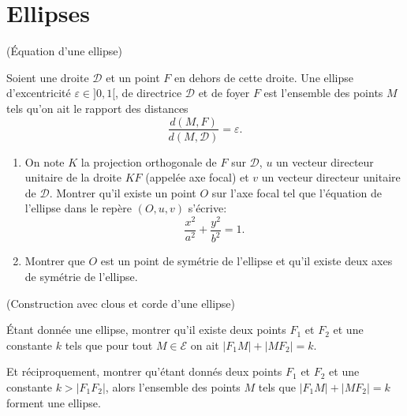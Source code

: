 \documentclass[a4paper,12pt,reqno]{amsart}
\begin{document}

\section{Ellipses}


\begin{exo} (Équation d'une ellipse)


  Soient une droite $\mathcal{D}$ et un point $F$ en dehors de cette droite. Une ellipse d'excentricité $\varepsilon \in ]0,1[$, de directrice $\mathcal{D}$ et de foyer $F$ est l'ensemble des points $M$ tels qu'on ait le rapport des distances
  $$
    \frac{d(M,F)}{d(M,\mathcal{D})}=\varepsilon.
  $$

  \begin{enumerate}
    \item On note $K$ la projection orthogonale de $F$ sur $\mathcal{D}$, $u$ un vecteur directeur unitaire de la droite $KF$ (appelée axe focal) et $v$ un vecteur directeur unitaire de $\mathcal{D}$.
    Montrer qu'il existe un point $O$ sur l'axe focal tel que l'équation de l'ellipse dans le repère $(O,u,v)$ s'écrive:
    $$
      \frac{x^{2}}{a^{2}}+\frac{y^{2}}{b^{2}}=1 .
    $$

    \item Montrer que $O$ est un point de symétrie de l'ellipse et qu'il existe deux axes de symétrie de l'ellipse.
  \end{enumerate}

\end{exo}


\begin{exo} (Construction avec clous et corde d'une ellipse)


  Étant donnée une ellipse, montrer qu'il existe deux points $F_{1}$ et $F_{2}$ et une constante $k$ tels que pour tout $M \in \mathcal{E}$ on ait $| F_{1}M | + | MF_{2} | = k$.

  Et réciproquement, montrer qu'étant donnés deux points $F_{1}$ et $F_{2}$ et une constante $k > | F_{1}F_{2} |$, alors l'ensemble des points $M$ tels que $| F_{1}M | + | MF_{2} | = k$ forment une ellipse.

\end{exo}
\end{document}

